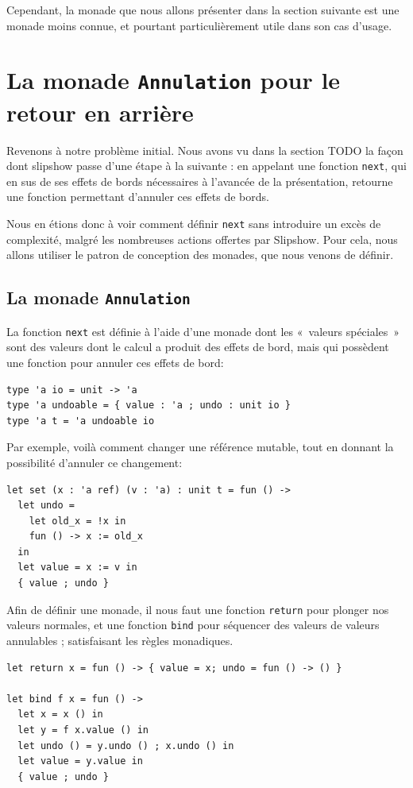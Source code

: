 \documentclass[final]{jflart}
\begin{document}
Cependant, la monade que nous allons présenter dans la section suivante est une monade moins connue, et pourtant particulièrement utile dans son cas d'usage.

\section{La monade \texttt{Annulation} pour le retour en arrière}

Revenons à notre problème initial. Nous avons vu dans la section TODO la façon dont slipshow passe d'une étape à la suivante : en appelant une fonction \texttt{next}, qui en sus de ses effets de bords nécessaires à l'avancée de la présentation, retourne une fonction permettant d'annuler ces effets de bords.

Nous en étions donc à voir comment définir \texttt{next} sans introduire un excès de complexité, malgré les nombreuses actions offertes par Slipshow. Pour cela, nous allons utiliser le patron de conception des monades, que nous venons de définir.

\subsection{La monade \texttt{Annulation}}

La fonction \texttt{next} est définie à l'aide d'une monade dont les «~valeurs spéciales~» sont des valeurs dont le calcul a produit des effets de bord, mais qui possèdent une fonction pour annuler ces effets de bord:

\begin{verbatim}
type 'a io = unit -> 'a
type 'a undoable = { value : 'a ; undo : unit io }
type 'a t = 'a undoable io
\end{verbatim}

Par exemple, voilà comment changer une référence mutable, tout en donnant la possibilité d'annuler ce changement:

\begin{verbatim}
let set (x : 'a ref) (v : 'a) : unit t = fun () ->
  let undo =
    let old_x = !x in
    fun () -> x := old_x
  in
  let value = x := v in
  { value ; undo }
\end{verbatim}

Afin de définir une monade, il nous faut une fonction \texttt{return} pour
plonger nos valeurs normales, et une fonction \texttt{bind} pour séquencer des
valeurs de valeurs annulables ; satisfaisant les règles monadiques.

\begin{verbatim}
let return x = fun () -> { value = x; undo = fun () -> () }

let bind f x = fun () ->
  let x = x () in
  let y = f x.value () in
  let undo () = y.undo () ; x.undo () in
  let value = y.value in
  { value ; undo }
\end{verbatim}
\end{document}
